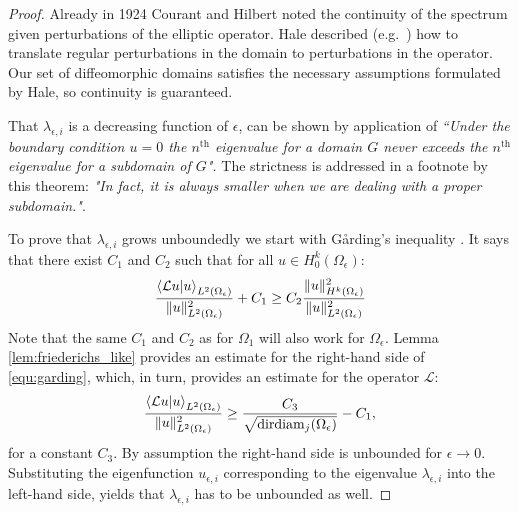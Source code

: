 \begin{proof}
  Already in 1924 Courant and Hilbert \cite[Vol I. Chapter V. Paragraph 13]{courant_methods_2008} noted the continuity of the spectrum given perturbations of the elliptic operator. Hale described (e.g.\ \cite{hale_eigenvalues_2005}) how to translate regular perturbations in the domain to perturbations in the operator. Our set of diffeomorphic domains satisfies the necessary assumptions formulated by Hale, so continuity is guaranteed.

  That $\lambda_{\epsilon, i}$ is a decreasing function of $\epsilon$, can be shown by application of \cite[Vol I, Chapter  VI, paragraph 2, Theorem 3]{courant_methods_2008} \emph{``Under the boundary condition $u = 0$ the $n^\text{th}$ eigenvalue for a domain $G$ never exceeds the $n^\text{th}$ eigenvalue for a subdomain of $G$".} The strictness is addressed in a footnote by this theorem: \emph{"In fact, it is always smaller when we are dealing with a proper subdomain."}.

  To prove that $\lambda_{\epsilon, i}$ grows unboundedly we start with Gårding's inequality \cite[Section 9.2.3]{renardy_introduction_2004}. It says that there exist $C_1$ and $C_2$ such that for all $u \in H^k_0(\Omega_\epsilon)$:
  \begin{equation}\label{equ:garding}
    \frac{\bra{\mathcal{L}u}\ket{u}_{L^2(\Omega_\epsilon)}}{\|u\|_{L^2(\Omega_\epsilon)}^2} + C_1 \geq C_2 \frac{\|u\|_{H^k(\Omega_\epsilon)}^2}{\|u\|_{L^2(\Omega_\epsilon)}^2}
  \end{equation}
  Note that the same $C_1$ and $C_2$ as for $\Omega_1$ will also work for $\Omega_\epsilon$. Lemma \ref{lem:friederichs_like} provides an estimate for the right-hand side of \eqref{equ:garding}, which, in turn, provides an estimate for the operator $\mathcal{L}$:
  $$
    \frac{\bra{\mathcal{L}u}\ket{u}_{L^2(\Omega_\epsilon)}}{\|u\|_{L^2(\Omega_\epsilon)}^2} \geq \frac{C_3}{\sqrt{\operatorname{dirdiam}_j(\Omega_\epsilon)}} - C_1\text{,}
  $$
  for a constant $C_3$. By assumption the right-hand side is unbounded for $\epsilon \to 0$. Substituting the eigenfunction $u_{\epsilon, i}$ corresponding to the eigenvalue $\lambda_{\epsilon, i}$ into the left-hand side, yields that $\lambda_{\epsilon, i}$ has to be unbounded as well.
\end{proof}

